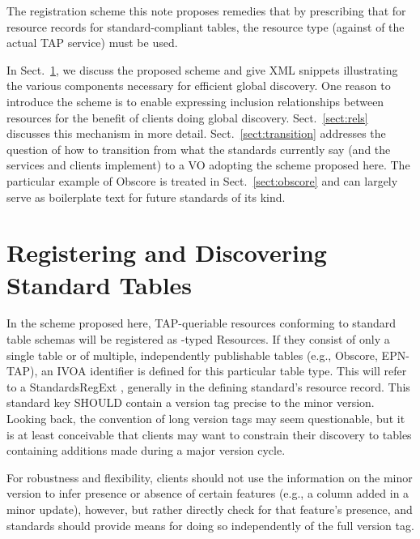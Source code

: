 \documentclass[11pt,a4paper]{ivoa}
\begin{document}
The registration scheme this note proposes
remedies that by prescribing that for resource records for
standard-compliant tables, the resource type 
(against  of the actual TAP service) must be used.

In Sect.~\ref{sect:norms}, we discuss the proposed scheme and give
XML snippets illustrating the various components necessary for efficient
global discovery.  One reason to
introduce the scheme is to enable expressing inclusion relationships
between resources for the benefit of clients doing global discovery.
Sect.~\ref{sect:rels} discusses this mechanism in more detail.
Sect.~\ref{sect:transition} addresses the question of how to transition
from what the standards currently say (and the services and clients
implement) to a VO adopting the scheme proposed here.  The particular
example of Obscore is treated in Sect.~\ref{sect:obscore} and can
largely serve as boilerplate text for future standards of its kind.


\section{Registering and Discovering Standard Tables}
\label{sect:norms}

In the scheme proposed here, TAP-queriable resources conforming to
standard table schemas will be registered as
-typed Resources.  If they consist of only a
single table or of multiple, independently publishable tables (e.g.,
Obscore, EPN-TAP), an IVOA identifier \citep{2016ivoa.spec.0523D} is
defined for this particular table type.  This will refer to a StandardsRegExt
\citep{2012ivoa.spec.0508H} , generally in the
defining standard's resource record.  This standard key SHOULD contain a
version tag precise to the minor version.  Looking back, the convention
of long version tags may seem questionable, but it is at least
conceivable that clients may want to constrain their discovery to tables
containing additions made during a major version cycle.

For robustness and flexibility, clients should not use the information
on the minor version to infer presence or absence of certain features
(e.g., a column added in a minor update), however, but rather directly
check for that feature's presence, and standards should provide means
for doing so independently of the full version tag.
\end{document}
